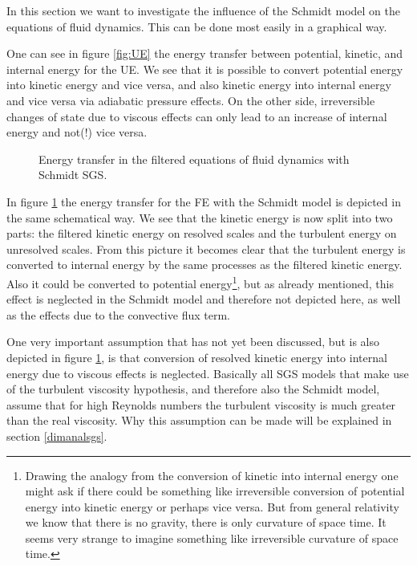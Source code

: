 In this section we want to investigate the influence of the Schmidt model on
the equations of fluid dynamics. This can be done most easily in a graphical
way.

One can see in figure \ref{fig:UE} the energy transfer between potential,
kinetic, and internal energy for the UE. We see that it is possible to convert
potential energy into kinetic energy and vice versa, and also kinetic energy
into internal energy and vice versa via adiabatic pressure effects. On the
other side, irreversible changes of state due to viscous effects can only lead
to an increase of internal energy and not(!) vice versa. 

\begin{figure}
\centering
\resizebox{0.7\textwidth}{!}{
%
}
\caption{Energy transfer in the filtered equations of fluid dynamics with
Schmidt SGS.} 
\label{fig:FE}
\end{figure}

In figure \ref{fig:FE} the energy transfer for the FE with the Schmidt model is
depicted in the same schematical way. We see that the kinetic energy is now
split into two parts:
the filtered kinetic energy on resolved scales and the turbulent energy on
unresolved scales. From this picture it becomes clear that the turbulent energy
is converted to internal energy by the same processes as the filtered kinetic
energy. Also it could be converted to potential energy\footnote{Drawing the
analogy from the conversion of kinetic into internal energy one might ask if
there could be something like irreversible conversion of potential energy into
kinetic energy or perhaps vice versa. But from general relativity we know that
there is no gravity, there is only curvature of space time. It seems very
strange to imagine something like irreversible curvature of space time.}, but as
already
mentioned, this effect is neglected in the Schmidt model and therefore not
depicted here, as well as the effects due to the convective flux term. 

One very important assumption that has not yet been discussed, but is also
depicted in figure \ref{fig:FE}, is that conversion of resolved kinetic energy
into internal energy due to viscous effects is neglected. Basically all SGS
models that make use of the turbulent viscosity hypothesis, and therefore also
the Schmidt model, assume that for high Reynolds numbers the turbulent viscosity
is much greater than the real viscosity. Why this assumption can be made will
be explained in section \ref{dimanalsgs}.

